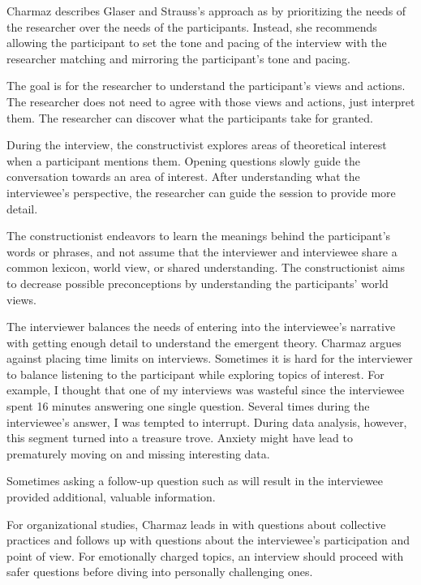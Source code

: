 Charmaz describes Glaser and Strauss's approach as \cite{GlaserDiscovery}  by prioritizing the needs of the researcher over the needs of the participants. Instead, she recommends allowing the participant to set the tone and pacing of the interview with the researcher matching and mirroring the participant's tone and pacing. 

The goal is for the researcher to understand the participant's views and actions. The researcher does not need to agree with those views and actions, just interpret them. The researcher can discover what the participants take for granted.

During the interview, the constructivist explores areas of theoretical interest when a participant mentions them. Opening questions slowly guide the conversation towards an area of interest. After understanding what the interviewee's perspective, the researcher can guide the session to provide more detail.

The constructionist endeavors to learn the meanings behind the participant's words or phrases, and not assume that the interviewer and interviewee share a common lexicon, world view, or shared understanding. The constructionist aims to decrease possible preconceptions by understanding the participants' world views. 

The interviewer balances the needs of entering into the interviewee's narrative with getting enough detail to understand the emergent theory. Charmaz argues against placing time limits on interviews. Sometimes it is hard for the interviewer to balance listening to the participant while exploring topics of interest. For example, I thought that one of my interviews was wasteful since the interviewee spent 16 minutes answering one single question. Several times during the interviewee's answer, I was tempted to interrupt. During data analysis, however, this segment turned into a treasure trove. Anxiety might have lead to prematurely moving on and missing interesting data. 

Sometimes asking a follow-up question such as  will result in the interviewee provided additional, valuable information.

For organizational studies, Charmaz leads in with questions about collective practices and follows up with questions about the interviewee's participation and point of view. For emotionally charged topics, an interview should proceed with safer questions before diving into personally challenging ones. 

